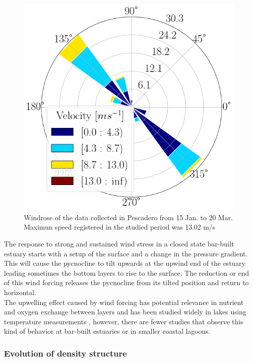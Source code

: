 \documentclass[tesis.tex]{subfiles}
\begin{document}
\begin{figure}[h!]
    \centering
    \includegraphics[scale=0.3]{Imagenes/windrose.png}
    \caption{Windrose of the data collected in Pescadero from 15 Jan. to 20 Mar. Maximun speed registered in the studied period was 13.02 m/s}
    \label{fig:windrose}
\end{figure}

The response to strong and sustained wind stress in a closed state bar-built estuary starts with a setup of the surface and a change in the pressure gradient. This will cause the pycnocline to tilt upwards at the upwind end of the estuary leading sometimes the bottom layers to rise to the surface. The reduction or end of this wind forcing releases the pycnocline from its tilted position and return to horizontal. \\

The upwelling effect caused by wind forcing has potential relevance in nutrient and oxygen exchange between layers \citep{Kelly2018} and has been studied widely in lakes using temperature measurements \citep{Coman2012, delafuente2010strong, roberts2021setup}, however, there are fewer studies that observe this kind of behavior at bar-built estuaries or in smaller coastal lagoons. \\

\subsubsection{Evolution of density structure}
\end{document}
